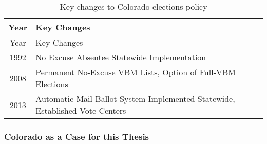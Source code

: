 \documentclass[]{article}
\begin{document}
\begin{longtable}[]{@{}cl@{}}
\caption{Key changes to Colorado elections policy
\label{tab:elect_policy}}\tabularnewline
\toprule
\begin{minipage}[b]{0.07\columnwidth}\centering\strut
Year\strut
\end{minipage} & \begin{minipage}[b]{0.87\columnwidth}\raggedright\strut
Key Changes\strut
\end{minipage}\tabularnewline
\midrule
\endfirsthead
\toprule
\begin{minipage}[b]{0.07\columnwidth}\centering\strut
Year\strut
\end{minipage} & \begin{minipage}[b]{0.87\columnwidth}\raggedright\strut
Key Changes\strut
\end{minipage}\tabularnewline
\midrule
\endhead
\begin{minipage}[t]{0.07\columnwidth}\centering\strut
1992\strut
\end{minipage} & \begin{minipage}[t]{0.87\columnwidth}\raggedright\strut
No Excuse Absentee Statewide Implementation\strut
\end{minipage}\tabularnewline
\begin{minipage}[t]{0.07\columnwidth}\centering\strut
2008\strut
\end{minipage} & \begin{minipage}[t]{0.87\columnwidth}\raggedright\strut
Permanent No-Excuse VBM Lists, Option of Full-VBM Elections\strut
\end{minipage}\tabularnewline
\begin{minipage}[t]{0.07\columnwidth}\centering\strut
2013\strut
\end{minipage} & \begin{minipage}[t]{0.87\columnwidth}\raggedright\strut
Automatic Mail Ballot System Implemented Statewide, Established Vote
Centers\strut
\end{minipage}\tabularnewline
\bottomrule
\end{longtable}

\subsubsection{Colorado as a Case for this
Thesis}\label{colorado-as-a-case-for-this-thesis}
\end{document}
